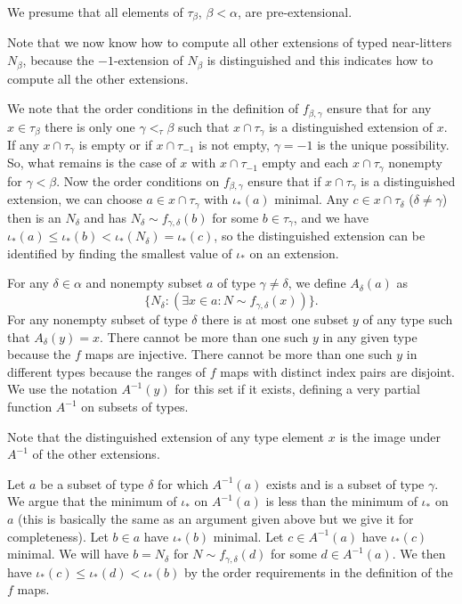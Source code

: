 \documentclass[112pt]{article}
\begin{document}
\begin{description}
We presume that all elements of $\tau_\beta$, $\beta<\alpha$, are pre-extensional. 

Note that we now know how to compute all other extensions of typed near-litters $N_\beta$, because the $-1$-extension of $N_\beta$ is distinguished and this indicates how to compute all the other extensions.





We note that the order conditions in the definition of $f_{\beta,\gamma}$ ensure that for any $x \in \tau_\beta$ there is only one $\gamma <_\tau \beta$ such that $x \cap \tau_\gamma$ is a distinguished extension of $x$.  If any $x \cap \tau_\gamma$ is empty or if $x \cap \tau_{-1}$ is not empty, $\gamma= -1$ is the unique possibility.  So, what remains is the case of $x$ with $x \cap \tau_{-1}$ empty and each $x \cap \tau_\gamma$ nonempty for $\gamma<\beta$.
Now the order conditions on $f_{\beta,\gamma}$ ensure that if $x \cap \tau_\gamma$ is a distinguished extension,
we can choose $a \in x \cap \tau_\gamma$ with $\iota_*(a)$ minimal.  Any $c \in x \cap \tau_\delta$ ($\delta \neq \gamma$) then is an $N_\delta$ and
has $N_\delta \sim f_{\gamma,\delta}(b)$ for some $b \in \tau_\gamma$, and we have $\iota_*(a) \leq \iota_*(b) < \iota_*(N_\delta) = \iota_*(c)$, so the distinguished extension can be identified by finding the smallest value of
$\iota_*$ on an extension.

For any $\delta \in \alpha$ and nonempty subset $a$ of type $\gamma \neq \delta$, we define $A_\delta(a)$ as $$\{N_\delta:(\exists x \in a:N \sim f_{\gamma,\delta}(x))\}.$$  For any nonempty subset of type $\delta$ there is at most one subset $y$ of any type such that $A_\delta(y)=x$.  There cannot be more than one such $y$ in any given type because the $f$ maps are injective.  There cannot be more than one such $y$ in different types because the ranges of $f$ maps with distinct index pairs are disjoint.   We use the notation $A^{-1}(y)$ for this set if it exists, defining a very partial function $A^{-1}$ on subsets of types.

Note that the distinguished extension of any type element $x$ is the image under $A^{-1}$ of the other extensions.

Let $a$ be a subset of type $\delta$ for which $A^{-1}(a)$ exists and is a subset of type $\gamma$.  We argue that the minimum of $\iota_*$ on
$A^{-1}(a)$ is less than the minimum of $\iota_*$ on $a$ (this is basically the same as an argument given above but we give it for completeness).    Let $b \in a$ have $\iota_*(b)$ minimal.  Let $c \in A^{-1}(a)$ have $\iota_*(c)$ minimal.   We will have $b = N_\delta$ for $N \sim f_{\gamma,\delta}(d)$ for some $d \in A^{-1}(a)$.  We then
have $\iota_*(c) \leq \iota_*(d) < \iota_*(b)$ by the order requirements in the definition of the $f$ maps.



\end{description}
\end{document}
